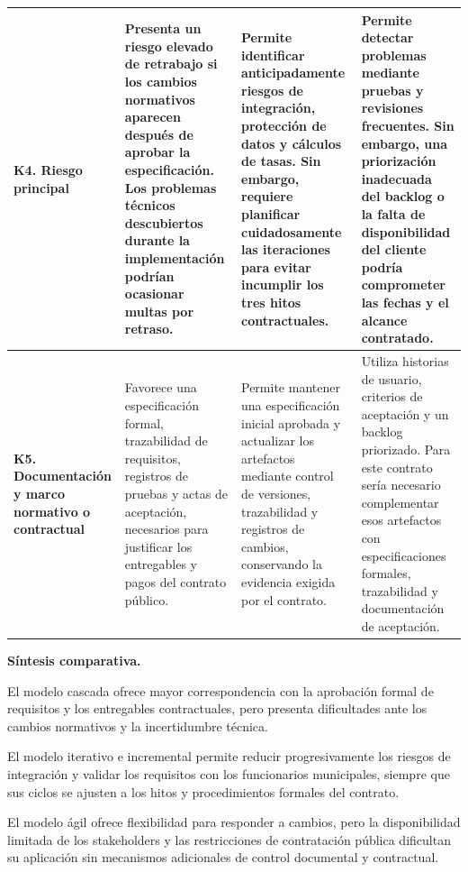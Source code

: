 \documentclass[12pt,a4paper]{article}
\begin{document}
\begin{longtable}{|>{\raggedright\arraybackslash}p{}|>{\raggedright\arraybackslash}p{}|>{\raggedright\arraybackslash}p{}|>{\raggedright\arraybackslash}p{}|}
\textbf{K4. Riesgo principal} &
Presenta un riesgo elevado de retrabajo si los cambios normativos aparecen después de aprobar la especificación. Los problemas técnicos descubiertos durante la implementación podrían ocasionar multas por retraso. &
Permite identificar anticipadamente riesgos de integración, protección de datos y cálculos de tasas. Sin embargo, requiere planificar cuidadosamente las iteraciones para evitar incumplir los tres hitos contractuales. &
Permite detectar problemas mediante pruebas y revisiones frecuentes. Sin embargo, una priorización inadecuada del backlog o la falta de disponibilidad del cliente podría comprometer las fechas y el alcance contratado. \\
\hline

\textbf{K5. Documentación y marco normativo o contractual} &
Favorece una especificación formal, trazabilidad de requisitos, registros de pruebas y actas de aceptación, necesarios para justificar los entregables y pagos del contrato público. &
Permite mantener una especificación inicial aprobada y actualizar los artefactos mediante control de versiones, trazabilidad y registros de cambios, conservando la evidencia exigida por el contrato. &
Utiliza historias de usuario, criterios de aceptación y un backlog priorizado. Para este contrato sería necesario complementar esos artefactos con especificaciones formales, trazabilidad y documentación de aceptación. \\
\hline

\end{longtable}
\endgroup

\normalsize

\noindent\textbf{Síntesis comparativa.}

El modelo cascada ofrece mayor correspondencia con la aprobación formal de requisitos y los entregables contractuales, pero presenta dificultades ante los cambios normativos y la incertidumbre técnica.

El modelo iterativo e incremental permite reducir progresivamente los riesgos de integración y validar los requisitos con los funcionarios municipales, siempre que sus ciclos se ajusten a los hitos y procedimientos formales del contrato.

El modelo ágil ofrece flexibilidad para responder a cambios, pero la disponibilidad limitada de los stakeholders y las restricciones de contratación pública dificultan su aplicación sin mecanismos adicionales de control documental y contractual.

\clearpage
\end{document}
